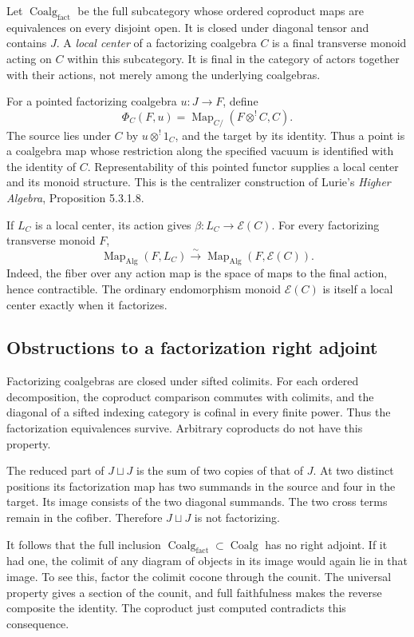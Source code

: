Let $\operatorname{Coalg}_{\mathrm{fact}}$
be the full subcategory whose ordered
coproduct maps are equivalences on
every disjoint open. It is closed
under diagonal tensor and contains
$J$. A \emph{local center} of a
factorizing coalgebra $C$ is a
final transverse monoid acting
on $C$ within this subcategory.
It is final in the category of
actors together with their actions,
not merely among the underlying
coalgebras.

For a pointed factorizing coalgebra
$u:J\to F$, define
\[
 \Phi_C(F,u)=
 \operatorname{Map}_{C/}(F\otimes^!C,C).
\]
The source lies under $C$ by
$u\otimes^!1_C$, and the target
by its identity. Thus a point
is a coalgebra map whose
restriction along the specified
vacuum is identified with the
identity of $C$.
Representability of this
pointed functor supplies a
local center and its monoid
structure. This is the
centralizer construction of
Lurie's \emph{Higher Algebra},
Proposition 5.3.1.8.

If $L_C$ is a local center,
its action gives
$\beta:L_C\to\mathcal E(C)$.
For every factorizing
transverse monoid $F$,
\[
 \operatorname{Map}_{\mathrm{Alg}}(F,L_C)
 \xrightarrow{\sim}
 \operatorname{Map}_{\mathrm{Alg}}(F,\mathcal E(C)).
\]
Indeed, the fiber over any
action map is the space
of maps to the final
action, hence contractible.
The ordinary endomorphism
monoid $\mathcal E(C)$
is itself a local center
exactly when it factorizes.

\subsection{Obstructions to a factorization right adjoint}
\label{v4-arith:centers:subsec:factorization-obstructions}

Factorizing coalgebras are
closed under sifted colimits.
For each ordered decomposition,
the coproduct comparison
commutes with colimits,
and the diagonal of a
sifted indexing category
is cofinal in every
finite power. Thus the
factorization equivalences
survive.
Arbitrary coproducts do
not have this property.

The reduced part of
$J\sqcup J$ is the sum
of two copies of that
of $J$. At two distinct
positions its factorization
map has two summands
in the source and
four in the target.
Its image consists
of the two diagonal
summands. The two
cross terms remain
in the cofiber.
Therefore
$J\sqcup J$ is not
factorizing.

It follows that the
full inclusion
$\operatorname{Coalg}_{\mathrm{fact}}
\subset\operatorname{Coalg}$
has no right adjoint.
If it had one,
the colimit of any
diagram of objects
in its image would
again lie in that
image. To see this,
factor the colimit
cocone through the
counit. The universal
property gives a
section of the
counit, and full
faithfulness makes
the reverse composite
the identity.
The coproduct just
computed contradicts
this consequence.

